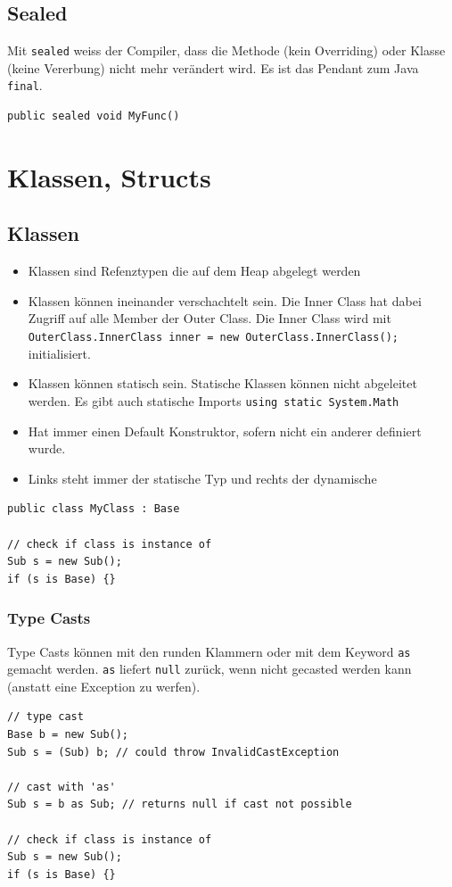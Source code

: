 \subsection{Sealed}
Mit \lstinline|sealed| weiss der Compiler, dass die Methode (kein Overriding) oder Klasse (keine Vererbung) nicht mehr verändert wird. Es ist das Pendant zum Java \lstinline|final|.
\begin{lstlisting} 
public sealed void MyFunc()
\end{lstlisting}

\section{Klassen, Structs}
\subsection{Klassen}
\begin{itemize}
	\item Klassen sind Refenztypen die auf dem Heap abgelegt werden
	\item Klassen können ineinander verschachtelt sein. Die Inner Class hat dabei Zugriff auf alle Member der Outer Class. Die Inner Class wird mit \lstinline|OuterClass.InnerClass inner = new OuterClass.InnerClass();| initialisiert.
	\item Klassen können statisch sein. Statische Klassen können nicht abgeleitet werden. Es gibt auch statische Imports \lstinline|using static System.Math|
	\item Hat immer einen Default Konstruktor, sofern nicht ein anderer definiert wurde.
	\item Links steht immer der statische Typ und rechts der dynamische
\end{itemize}
\begin{lstlisting}
public class MyClass : Base

// check if class is instance of
Sub s = new Sub();
if (s is Base) {}
\end{lstlisting}

\subsubsection{Type Casts}
Type Casts können mit den runden Klammern oder mit dem Keyword \lstinline|as| gemacht werden. \lstinline|as| liefert \lstinline|null| zurück, wenn nicht gecasted werden kann (anstatt eine Exception zu werfen). 
\begin{lstlisting}
// type cast
Base b = new Sub();
Sub s = (Sub) b; // could throw InvalidCastException

// cast with 'as'
Sub s = b as Sub; // returns null if cast not possible

// check if class is instance of
Sub s = new Sub();
if (s is Base) {}
\end{lstlisting}

